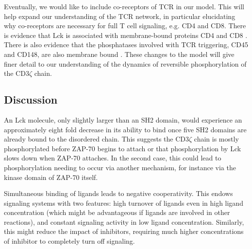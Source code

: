 \documentclass[../../AdvancementSummary.tex]{subfiles}
\begin{document}
Eventually, we would like to include co-receptors of TCR in our model. This will help expand our understanding of the TCR network, in particular elucidating why co-receptors are necessary for full T cell signaling, e.g. CD4 and CD8. There is evidence that Lck is associated with membrane-bound proteins CD4 and CD8 \cite{Barber1989, Veillette1988, Rudd1988}. There is also evidence that the phosphatases involved with TCR triggering, CD45 and CD148, are also membrane bound \cite{Davis2006}. These changes to the model will give finer detail to our understanding of the dynamics of reversible phosphorylation of the CD3$\zeta$ chain.




\subsection{Discussion}

An Lck molecule, only slightly larger than an SH2 domain, would experience an approximately eight fold decrease in its ability to bind once five SH2 domains are already bound to the disordered chain. This suggests the CD3$\zeta$ chain is mostly phosphorylated before ZAP-70 begins to attach or that phosphorylation by Lck slows down when ZAP-70 attaches. In the second case, this could lead to phosphorylation needing to occur via another mechanism, for instance via the kinase domain of ZAP-70 itself. 

Simultaneous binding of ligands leads to negative cooperativity. This endows signaling systems with two features: high turnover of ligands even in high ligand concentration (which might be advantageous if ligands are involved in other reactions), and constant signaling activity in low ligand concentration. Similarly, this might reduce the impact of inhibitors, requiring much higher concentrations of inhibitor to completely turn off signaling.



\end{document}
